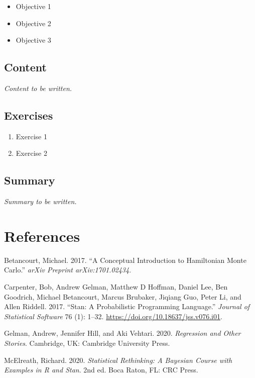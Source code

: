 \documentclass[
  11pt,
  a4paper,
  oneside,
  openany]{scrbook}
\providecommand{\tightlist}{%
  \setlength{\itemsep}{0pt}\setlength{\parskip}{0pt}}\usepackage{longtable,booktabs,array}
\newlength{\cslhangindent}
\newenvironment{CSLReferences}[2] %
 {\begin{list}{}{%
  \setlength{\itemindent}{0pt}
  \setlength{\leftmargin}{0pt}
  \setlength{\parsep}{0pt}
  \ifodd #1
   \setlength{\leftmargin}{\cslhangindent}
   \setlength{\itemindent}{-1\cslhangindent}
  \fi
  \setlength{\itemsep}{#2\baselineskip}}}
 {\end{list}}
\begin{document}
\begin{itemize}
\tightlist
\item[$\square$]
  Objective 1
\item[$\square$]
  Objective 2
\item[$\square$]
  Objective 3
\end{itemize}

\section{Content}\label{content-18}

\emph{Content to be written.}

\section{Exercises}\label{exercises-19}

\begin{enumerate}
\def\labelenumi{\arabic{enumi}.}
\tightlist
\item
  Exercise 1
\item
  Exercise 2
\end{enumerate}

\section{Summary}\label{summary-19}

\emph{Summary to be written.}

\cleardoublepage
{}
{}
\appendix

\chapter*{References}\label{references}


\label{refs}
\begin{CSLReferences}{1}{0}
Betancourt, Michael. 2017. {``A Conceptual Introduction to {Hamiltonian
Monte Carlo}.''} \emph{arXiv Preprint arXiv:1701.02434}.

Carpenter, Bob, Andrew Gelman, Matthew D Hoffman, Daniel Lee, Ben
Goodrich, Michael Betancourt, Marcus Brubaker, Jiqiang Guo, Peter Li,
and Allen Riddell. 2017. {``Stan: A Probabilistic Programming
Language.''} \emph{Journal of Statistical Software} 76 (1): 1--32.
\url{https://doi.org/10.18637/jss.v076.i01}.

Gelman, Andrew, Jennifer Hill, and Aki Vehtari. 2020. \emph{Regression
and Other Stories}. Cambridge, UK: Cambridge University Press.

McElreath, Richard. 2020. \emph{Statistical Rethinking: A {Bayesian}
Course with Examples in {R} and {Stan}}. 2nd ed. Boca Raton, FL: CRC
Press.

\end{CSLReferences}


\backmatter
\end{document}
